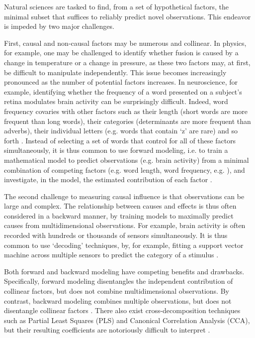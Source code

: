 Natural sciences are tasked to find, from a set of hypothetical factors, the minimal subset that suffices to reliably predict novel observations. This endeavor is impeded by two major challenges.

First, causal and non-causal factors may be numerous and collinear. In physics, for example, one may be challenged to identify whether fusion is caused by a change in temperature or a change in pressure, as these two factors may, at first, be difficult to manipulate independently. This issue becomes increasingly pronounced as the number of potential factors increases. In neuroscience, for example, identifying whether the frequency of a word presented on a subject's retina modulates brain activity can be surprisingly difficult. Indeed, word frequency covaries with other factors such as their length (short words are more frequent than long words), their categories (determinants are more frequent than adverbs), their individual letters (e.g. words that contain `z' are rare) and so forth \citep{kutas2011thirty,pegado2014timing}. Instead of selecting a set of words that control for all of these factors simultaneously, it is thus common to use forward modeling, i.e. to train a mathematical model to predict observations (e.g. brain activity) from a minimal combination of competing factors (e.g. word length, word frequency, e.g. \citep{huth2016natural}), and investigate, in the model, the estimated contribution of each factor \citep{friston1994statistical}.

The second challenge to measuring causal influence is that observations can be large and complex. The relationship between causes and effects is thus often considered in a backward manner, by training models to maximally predict causes from multidimensional observations. For example, brain activity is often recorded with hundreds or thousands of sensors simultaneously. It is thus common to use `decoding' techniques, by, for example, fitting a support vector machine across multiple sensors to predict the category of a stimulus \citep{cichy2014resolving, king2016brain, kriegeskorte2008representational, norman2006beyond}.

Both forward and backward modeling have competing benefits and drawbacks. Specifically, forward modeling disentangles the independent contribution of collinear factors, but does not combine multidimensional observations. By contrast, backward modeling combines multiple observations, but does not disentangle collinear factors \cite{weichwald2015causal, hebart2018deconstructing, king2018encoding}. There also exist cross-decomposition techniques such as Partial Least Squares (PLS) and Canonical Correlation Analysis (CCA), but their resulting coefficients are notoriously difficult to interpret \citep{lebart1995statistique}.

